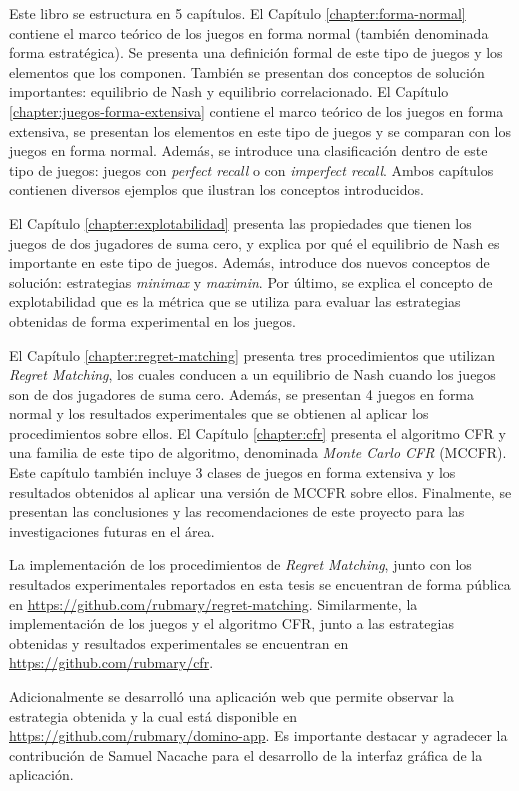 Este libro se estructura en 5 capítulos. El Capítulo \ref{chapter:forma-normal} contiene el marco teórico de los juegos en forma normal (también denominada forma estratégica). Se presenta una definición formal de este tipo de juegos y los elementos que los componen. También se presentan dos conceptos de solución importantes: equilibrio de Nash y equilibrio correlacionado. El Capítulo \ref{chapter:juegos-forma-extensiva} contiene el marco teórico de los juegos en forma extensiva, se presentan los elementos en este tipo de juegos y se comparan con los juegos en forma normal. Además, se introduce una clasificación dentro de este tipo de juegos: juegos con \textit{perfect recall} o con \textit{imperfect recall}. Ambos capítulos contienen diversos ejemplos que ilustran los conceptos introducidos.

El Capítulo \ref{chapter:explotabilidad} presenta las propiedades que tienen los juegos de dos jugadores de suma cero, y explica por qué el equilibrio de Nash es importante en este tipo de juegos. Además, introduce dos nuevos conceptos de solución: estrategias \textit{minimax} y \textit{maximin}. Por último, se explica el concepto de explotabilidad que es la métrica que se utiliza para evaluar las estrategias obtenidas de forma experimental en los juegos.

El Capítulo \ref{chapter:regret-matching} presenta tres procedimientos que utilizan \textit{Regret Matching}, los cuales conducen a un equilibrio de Nash cuando los juegos son de dos jugadores de suma cero. Además, se presentan 4 juegos en forma normal y los resultados experimentales que se obtienen al aplicar los procedimientos sobre ellos. El Capítulo \ref{chapter:cfr} presenta el algoritmo CFR y una familia de este tipo de algoritmo, denominada \textit{Monte Carlo CFR} (MCCFR). Este capítulo también incluye 3 clases de juegos en forma extensiva y los resultados obtenidos al aplicar una versión de MCCFR sobre ellos. Finalmente, se presentan las conclusiones y las recomendaciones de este proyecto para las investigaciones futuras en el área.

La implementación de los procedimientos de \textit{Regret Matching}, junto con los resultados experimentales reportados en esta tesis se encuentran de forma pública en \url{https://github.com/rubmary/regret-matching}. Similarmente, la implementación de los juegos y el algoritmo CFR, junto a las estrategias obtenidas y resultados experimentales se encuentran en \url{https://github.com/rubmary/cfr}.

Adicionalmente se desarrolló una aplicación web que permite observar la estrategia obtenida y la cual está disponible en \url{https://github.com/rubmary/domino-app}. Es importante destacar y agradecer la contribución de Samuel Nacache para el desarrollo de la interfaz gráfica de la aplicación.